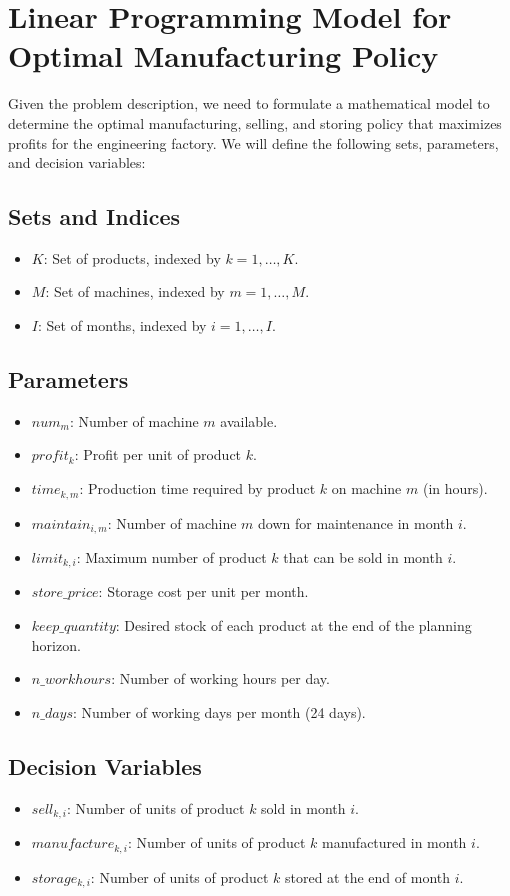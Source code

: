 \documentclass{article}
\begin{document}
\section*{Linear Programming Model for Optimal Manufacturing Policy}

Given the problem description, we need to formulate a mathematical model to determine the optimal manufacturing, selling, and storing policy that maximizes profits for the engineering factory. We will define the following sets, parameters, and decision variables:

\subsection*{Sets and Indices}
\begin{itemize}
    \item $K$: Set of products, indexed by $k = 1, \ldots, K$.
    \item $M$: Set of machines, indexed by $m = 1, \ldots, M$.
    \item $I$: Set of months, indexed by $i = 1, \ldots, I$.
\end{itemize}

\subsection*{Parameters}
\begin{itemize}
    \item $num_{m}$: Number of machine $m$ available.
    \item $profit_{k}$: Profit per unit of product $k$.
    \item $time_{k,m}$: Production time required by product $k$ on machine $m$ (in hours).
    \item $maintain_{i,m}$: Number of machine $m$ down for maintenance in month $i$.
    \item $limit_{k,i}$: Maximum number of product $k$ that can be sold in month $i$.
    \item $store\_price$: Storage cost per unit per month.
    \item $keep\_quantity$: Desired stock of each product at the end of the planning horizon.
    \item $n\_workhours$: Number of working hours per day.
    \item $n\_days$: Number of working days per month (24 days).
\end{itemize}

\subsection*{Decision Variables}
\begin{itemize}
    \item $sell_{k,i}$: Number of units of product $k$ sold in month $i$.
    \item $manufacture_{k,i}$: Number of units of product $k$ manufactured in month $i$.
    \item $storage_{k,i}$: Number of units of product $k$ stored at the end of month $i$.
\end{itemize}
\end{document}
